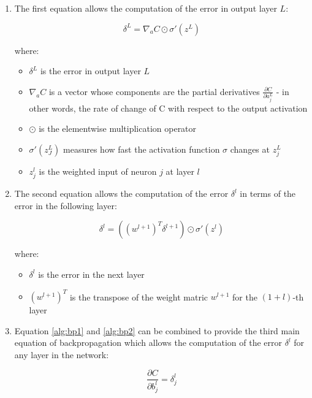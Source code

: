 \begin{enumerate}
    \item The first equation allows the computation of the error in output layer $L$:
    \begin{ceqn}
        \begin{equation}\label{alg:bp1}
            \delta^L = \nabla_aC\odot\sigma'(z^L)
        \end{equation}
    \end{ceqn}
    \noindent where:
    \begin{itemize}
         \item $\delta^L$ is the error in output layer $L$
        \item $\nabla_aC$ is a vector whose components are the partial derivatives $\frac{\partial C}{\partial a_j^L}$ - in other words, the rate of change of C with   respect to the output activation
        \item $\odot$ is the elementwise multiplication operator
        \item $\sigma'(z_J^L)$ measures how fast the activation function $\sigma$ changes at $z_j^L$
        \item $z_j^l$ is the weighted input of neuron $j$ at layer $l$
    \end{itemize}

    \item The second equation allows the computation of the error $\delta^l$ in terms of the error in the following layer:
    \begin{ceqn}
        \begin{equation}\label{alg:bp2}
            \delta^l = ((w^{l+1})^T\delta^{l+1})\odot\sigma'(z^l)
        \end{equation}
    \end{ceqn}
    \noindent where:
    \begin{itemize}
        \item $\delta^l$ is the error in the next layer
        \item $(w^{l+1})^T$ is the transpose of the weight matric $w^{l+1}$ for the $(1+l)$-th layer
    \end{itemize}

    \item Equation \ref{alg:bp1} and \ref{alg:bp2} can be combined to provide the third main equation of backpropagation which allows the computation of the error $\delta^l$ for any layer in the network:
    \begin{ceqn}
        \begin{equation}\label{alg:bp3}
            \frac{\partial C}{\partial b_j^l} = \delta_j^l
        \end{equation}
    \end{ceqn}


\end{enumerate}
